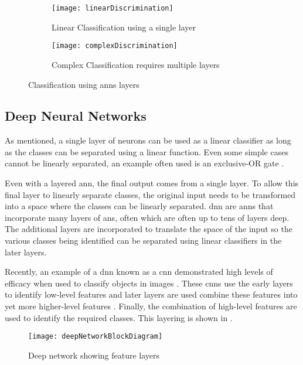 \begin{figure}[h]
\centering
  \begin{subfigure}{.4\textwidth}
    \centering
    \texttt{[image: linearDiscrimination]}
    \captionsetup{width=.8\textwidth, justification=centering, skip=20pt}
    \caption{Linear Classification using a single layer}
    \label{fig:linear discrimination}
  \end{subfigure}%
  \begin{subfigure}{.4\textwidth}
    \centering
    \texttt{[image: complexDiscrimination]}
    \captionsetup{width=.8\textwidth, justification=centering, skip=10pt}
    \caption{Complex Classification requires multiple layers}
    \label{fig:complex discrimination}
  \end{subfigure}
\captionsetup{justification=centering, skip=10pt}
\caption{Classification using \acp{ann} layers \cite{NNintro_Bullinaria}}
\label{fig:Discrimination}
\end{figure}


\subsection{Deep Neural Networks}
\label{sec:Deep Neural Networks}

As mentioned, a single layer of neurons can be used as a linear classifier as long as the classes can be separated using a linear function.
Even some simple cases cannot be linearly separated, an example often used is an exclusive-OR gate \cite{NNintro_Bullinaria}.

Even with a layered \ac{ann}, the final output comes from a single layer. To allow this final layer to linearly separate classes, the original input needs to be transformed into a space where the classes can be linearly separated.
\acf{dnn} are \acp{ann} that incorporate many layers of \acp{an}, often which are often up to tens of layers deep.
The additional layers are incorporated to translate the space of the input so the various classes being identified can be separated using linear classifiers in the later layers.

Recently, an example of a \ac{dnn} known as a \acf{cnn} demonstrated high levels of efficacy when used to classify objects in images \cite{krizhevsky2012imagenet}.
These \acp{cnn} use the early layers to identify low-level features and later layers are used combine these features into yet more higher-level features \cite{Kwolek2005}\cite{wikipedia_deep_learning}\cite{deeplearning4j}.
Finally, the combination of high-level features are used to identify the required classes.
This layering is shown in .
\begin{figure}[h]
\centering
\texttt{[image: deepNetworkBlockDiagram]}
\captionsetup{justification=centering, skip=5pt}
\caption{Deep network showing feature layers}
\label{fig:Deep network showing feature layers}
\end{figure}

